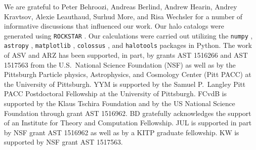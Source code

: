 \documentclass[usenatbib,fleqn]{mnras}
\begin{document}
We are grateful to Peter Behroozi, Andreas Berlind, Andrew Hearin, Andrey Kravtsov, Alexie Leauthaud, Surhud More, and Risa \mbox{Wechsler} for a number of informative discussions that influenced our work. Our halo catalogs were generated using {\tt ROCKSTAR} \citep{behroozi_etal13a}. Our calculations were carried out utilizing the {\tt numpy} \citep{numpy}, {\tt astropy} \citep{astropy}, {\tt matplotlib} \citep{matplotlib}, {\tt colossus} \citep{diemer_kravtsov15}, and {\tt halotools} \citep{halotools} packages in Python. The work of ASV and ARZ has been supported, in part, by grants AST 1516266 and AST 1517563 from the U.S.\ National Science Foundation (NSF) as well as by the Pittsburgh Particle physics, Astrophysics, and Cosmology Center (Pitt PACC) at the University of Pittsburgh. YYM is supported by the Samuel P.\ Langley Pitt PACC Postdoctoral Fellowship at the University of Pittsburgh. FCvdB is supported by the Klaus Tschira Foundation and by the US National Science Foundation through grant AST 1516962. BD gratefully acknowledges the support of an Institute for Theory and Computation Fellowship. JUL is supported in part by NSF grant AST 1516962 as well as by a KITP graduate fellowship. KW is supported by NSF grant AST 1517563. 




\label{lastpage}
\end{document}
